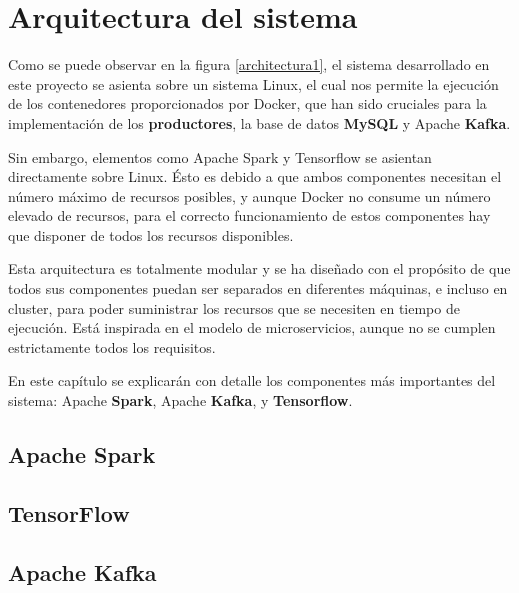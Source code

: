 \chapter{Arquitectura del sistema}\label{cap5}



Como se puede observar en la figura \ref{architectura1}, el sistema desarrollado en este proyecto se asienta sobre un sistema Linux, el cual nos permite la ejecución de los contenedores proporcionados por Docker, que han sido cruciales para la implementación de los \textbf{productores}, la base de datos \textbf{MySQL} y Apache \textbf{Kafka}.

Sin embargo, elementos como Apache Spark y Tensorflow se asientan directamente sobre Linux. Ésto es debido a que ambos componentes necesitan el número máximo de recursos posibles, y aunque Docker no consume un número elevado de recursos, para el correcto funcionamiento de estos componentes hay que disponer de todos los recursos disponibles.

Esta arquitectura es totalmente modular y se ha diseñado con el propósito de que todos sus componentes puedan ser separados en diferentes máquinas, e incluso en cluster, para poder suministrar los recursos que se necesiten en tiempo de ejecución. Está inspirada en el modelo de microservicios, aunque no se cumplen estrictamente todos los requisitos.

En este capítulo se explicarán con detalle los componentes más importantes del sistema: Apache \textbf{Spark}, Apache \textbf{Kafka}, y \textbf{Tensorflow}.


\clearpage

\section{Apache Spark}\label{sec:spark}




\section{TensorFlow}\label{sec:tensorflow}





\section{Apache Kafka}\label{sec:kafka}


